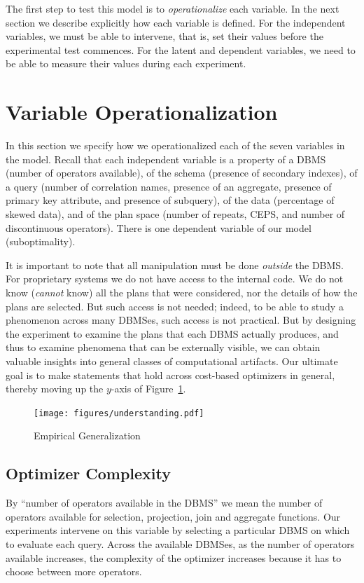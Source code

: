 \documentclass[prodmode,acmtods]{acmsmall}
\begin{document}
The first step to test this model is to {\em operationalize} each
variable. In the next section we describe explicitly how each variable is
defined. For the independent variables, we must be able to intervene, that is,
set their values before the experimental test commences. For the latent and
dependent variables, we need to be able to measure their values during each experiment.

\section{Variable Operationalization}\label{sec:operationalization}

In this section we specify how we operationalized each of the seven
variables in the model.  Recall that each independent variable is a property
of a \hbox{DBMS} (number of operators available), of the schema (presence
  of secondary indexes), of a query (number of correlation names,
presence of an aggregate, presence of primary key attribute, and
presence of subquery), of the data (percentage of skewed data), and of
the plan space (number of repeats, CEPS, and number of discontinuous
operators). There is 
one dependent variable of our model (suboptimality).

It is important to note that all manipulation must be done {\em
  outside} the \hbox{DBMS}. For proprietary systems we do not have access to the
internal code. We do not know ({\em cannot} know) all the plans that were
considered, nor the details of how the plans are selected. But such access
is not needed; indeed, to be able to study a phenomenon across many \hbox{DBMSes},
such access is not practical. But by designing the experiment to examine
the plans that each \hbox{DBMS} actually produces, and thus to examine phenomena
that can be externally visible, we can obtain valuable insights into general
classes of computational artifacts. Our ultimate goal is to make statements
that hold across cost-based optimizers in general, thereby moving up the
$y$-axis of Figure~\ref{fig:empirical}.

\begin{figure}[t]
\centering
\texttt{[image: figures/understanding.pdf]}%
\caption{Empirical Generalization\label{fig:empirical}}
\end{figure}


\subsection{Optimizer Complexity}
By ``number of operators available in the \hbox{DBMS}'' we mean the \hbox{number} of operators
available for selection, projection, join and aggregate functions. Our
experiments intervene on this variable by selecting a particular \hbox{DBMS} on
which to evaluate each query. Across the available \hbox{DBMSes}, as the number of
operators available increases, the complexity of the optimizer increases
because it has to choose between more operators.
\end{document}
